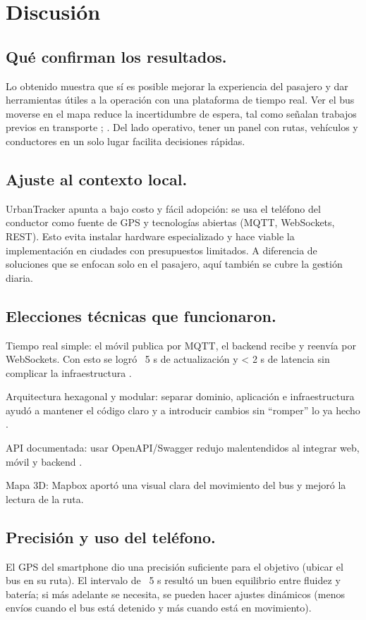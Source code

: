 \section{Discusión}

\subsection{Qué confirman los resultados.}
Lo obtenido muestra que sí es posible mejorar la experiencia del pasajero y dar herramientas útiles a la operación con una plataforma de tiempo real. Ver el bus moverse en el mapa reduce la incertidumbre de espera, tal como señalan trabajos previos en transporte \cite{cityruta2018}; \cite{stopbus2016}. Del lado operativo, tener un panel con rutas, vehículos y conductores en un solo lugar facilita decisiones rápidas.

\subsection{Ajuste al contexto local.}
UrbanTracker apunta a bajo costo y fácil adopción: se usa el teléfono del conductor como fuente de GPS y tecnologías abiertas (MQTT, WebSockets, REST). Esto evita instalar hardware especializado y hace viable la implementación en ciudades con presupuestos limitados. A diferencia de soluciones que se enfocan solo en el pasajero, aquí también se cubre la gestión diaria.

\subsection{Elecciones técnicas que funcionaron.}
Tiempo real simple: el móvil publica por MQTT, el backend recibe y reenvía por WebSockets. Con esto se logró ~5 s de actualización y < 2 s de latencia sin complicar la infraestructura \cite{sismo2016}.

Arquitectura hexagonal y modular: separar dominio, aplicación e infraestructura ayudó a mantener el código claro y a introducir cambios sin “romper” lo ya hecho \cite{poo2023}.

API documentada: usar OpenAPI/Swagger redujo malentendidos al integrar web, móvil y backend \cite{easyrest2022}.

Mapa 3D: Mapbox aportó una visual clara del movimiento del bus y mejoró la lectura de la ruta.

\subsection{Precisión y uso del teléfono.}
El GPS del smartphone dio una precisión suficiente para el objetivo (ubicar el bus en su ruta). El intervalo de ~5 s resultó un buen equilibrio entre fluidez y batería; si más adelante se necesita, se pueden hacer ajustes dinámicos (menos envíos cuando el bus está detenido y más cuando está en movimiento).

